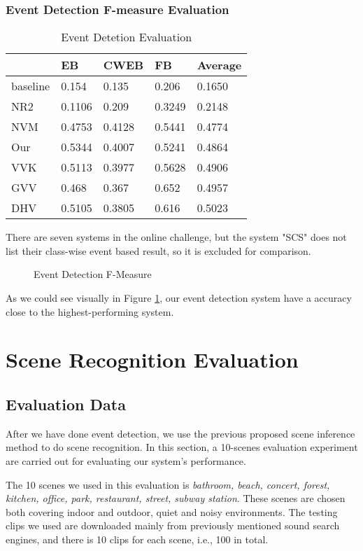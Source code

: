 \subsubsection{Event Detection F-measure Evaluation}
\begin{table}[htb]
\centering
\caption{Event Detetion Evaluation}
\begin{tabular}{lllll}
\hline
         & EB    & CWEB  & FB    & Average \\
\hline
baseline & 0.154  & 0.135  & 0.206  & 0.1650   \\
NR2      & 0.1106 & 0.209  & 0.3249 & 0.2148   \\
NVM      & 0.4753 & 0.4128 & 0.5441 & 0.4774   \\
Our      & 0.5344 & 0.4007 & 0.5241 & 0.4864   \\
VVK      & 0.5113 & 0.3977 & 0.5628 & 0.4906   \\
GVV      & 0.468  & 0.367  & 0.652  & 0.4957   \\
DHV      & 0.5105 & 0.3805 & 0.616  & 0.5023   \\     
\hline
\end{tabular}
\end{table}
There are seven systems in the online challenge, but the system "SCS" does not list their class-wise event based result, so it is excluded for comparison. 
\begin{figure}[htb!]
\centering

\caption{Event Detection F-Measure}
\label{fig:eventdetectF1}
\end{figure}
As we could see visually in Figure \ref{fig:eventdetectF1}, our event detection system have a accuracy close to the highest-performing system. 

\section{Scene Recognition Evaluation}
\subsection{Evaluation Data}
After we have done event detection, we use the previous proposed scene inference method to do scene recognition. 
In this section, a 10-scenes evaluation experiment are carried out for evaluating our system's performance.

The 10 scenes we used in this evaluation is \textit{bathroom, beach, concert, forest, kitchen, office, park, restaurant, street, subway station}. 
These scenes are chosen both covering indoor and outdoor, quiet and noisy environments. 
The testing clips we used are downloaded mainly from previously mentioned sound search engines, and there is 10 clips for each scene, i.e., 100 in total. 

